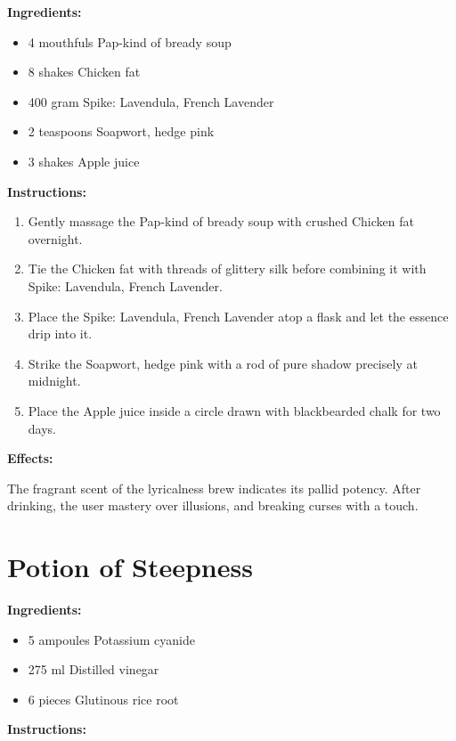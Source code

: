 \documentclass{article}
\begin{document}
\textbf{Ingredients:}

\begin{itemize}
  \item 4 mouthfuls Pap-kind of bready soup
  \item 8 shakes Chicken fat
  \item 400 gram Spike: Lavendula, French Lavender
  \item 2 teaspoons Soapwort, hedge pink
  \item 3 shakes Apple juice
\end{itemize}

\textbf{Instructions:}

\begin{enumerate}
  \item Gently massage the Pap-kind of bready soup with crushed Chicken fat overnight.
  \item Tie the Chicken fat with threads of glittery silk before combining it with Spike: Lavendula, French Lavender.
  \item Place the Spike: Lavendula, French Lavender atop a flask and let the essence drip into it.
  \item Strike the Soapwort, hedge pink with a rod of pure shadow precisely at midnight.
  \item Place the Apple juice inside a circle drawn with blackbearded chalk for two days.
\end{enumerate}

\textbf{Effects:}

The fragrant scent of the lyricalness brew indicates its pallid potency. After drinking, the user mastery over illusions, and breaking curses with a touch.

\newpage
\section*{Potion of Steepness}

\textbf{Ingredients:}

\begin{itemize}
  \item 5 ampoules Potassium cyanide
  \item 275 ml Distilled vinegar
  \item 6 pieces Glutinous rice root
\end{itemize}

\textbf{Instructions:}
\end{document}
